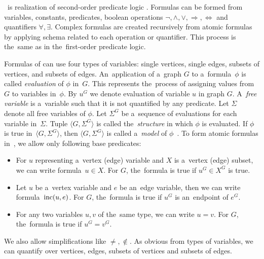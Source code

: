 \MSO{}~is realization of second-order predicate logic%
.
Formulas can be formed from
variables, constants, predicates,
boolean operations \( \lnot, \land, \lor, \Rightarrow, \Leftrightarrow \)
and quantifiers \( \forall, \exists \).
Complex formulas are created recursively from atomic formulas
by applying schema related to each operation or quantifier.
This process is the~same as in the~first-order predicate logic.

Formulas of \MSO{} can use four types of variables:
single vertices, single edges, subsets of vertices, and subsets of edges.
%
An~application of a~graph \( G \) to a~formula~\( \phi \) is called \emph{evaluation}
of \( \phi \) in~\( G \).
This represents the~process of assigning values from \( G \) to variables in~\( \phi \).
%
By \( u^G \) we denote evaluation of variable \( u \) in graph \( G \).
%
A~\emph{free variable} is a~variable such that it is not quantified by any predicate.
Let \( \Sigma \) denote all free variables of \( \phi \).
%
Let \( \Sigma^G \) be a~sequence of evaluations for each variable in~\( \Sigma \).
Tuple \( \langle G, \Sigma^G \rangle \) is called the~\emph{structure}
in which \( \phi \) is evaluated.
If \( \phi \) is true in~\( \langle G, \Sigma^G \rangle \),
then \( \langle G, \Sigma^G \rangle \)
is called a~\emph{model} of \( \phi \)~\cite{book_parametrized_algorithms}.
%
To form atomic formulas in~\MSO{}, we allow only following base predicates:
%
\begin{itemize}
	\item For \( u \) representing a~vertex (edge) variable
	      and \( X \) is a~vertex (edge) subset,
	      we can write formula~\( u \in X \).
	      For \( G \), the~formula is true if \( u^G \in X^G \) is true.
	\item Let \( u \) be a~vertex variable and \( e \) be an~edge variable,
	      then we can write formula~\( \text{inc} (u, e) \).
	      For \( G \), the~formula is true if \( u^G \) is an~endpoint of \( e^G \).
	\item For any two variables \( u, v \) of the~same type, we can write \( u = v \).
	      For \( G \), the~formula is true if \( u^G = v^G \).
\end{itemize}
%
We also allow simplifications like \( \ne, \not\in \).
As obvious from types of variables, we can quantify over vertices, edges,
subsets of vertices and subsets of edges.


